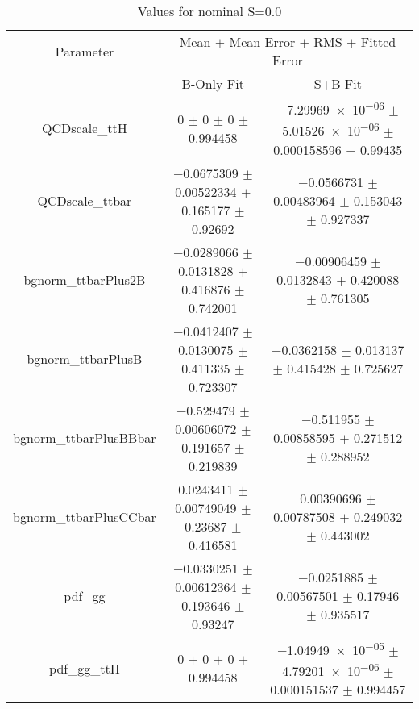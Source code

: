 \begin{table}
\centering
\caption{Values for nominal S=0.0}
\begin{tabular}{ccc}
\toprule
Parameter & \multicolumn{2}{c}{Mean $\pm$ Mean Error $\pm$ RMS $\pm$ Fitted Error}\\
 & B-Only Fit & S+B Fit\\
\midrule
QCDscale\_ttH & \num{0} $\pm$ \num{0} $\pm$ \num{0} $\pm$ \num{0.994458} & \num{-7.29969e-06} $\pm$ \num{5.01526e-06} $\pm$ \num{0.000158596} $\pm$ \num{0.99435}\\
QCDscale\_ttbar & \num{-0.0675309} $\pm$ \num{0.00522334} $\pm$ \num{0.165177} $\pm$ \num{0.92692} & \num{-0.0566731} $\pm$ \num{0.00483964} $\pm$ \num{0.153043} $\pm$ \num{0.927337}\\
bgnorm\_ttbarPlus2B & \num{-0.0289066} $\pm$ \num{0.0131828} $\pm$ \num{0.416876} $\pm$ \num{0.742001} & \num{-0.00906459} $\pm$ \num{0.0132843} $\pm$ \num{0.420088} $\pm$ \num{0.761305}\\
bgnorm\_ttbarPlusB & \num{-0.0412407} $\pm$ \num{0.0130075} $\pm$ \num{0.411335} $\pm$ \num{0.723307} & \num{-0.0362158} $\pm$ \num{0.013137} $\pm$ \num{0.415428} $\pm$ \num{0.725627}\\
bgnorm\_ttbarPlusBBbar & \num{-0.529479} $\pm$ \num{0.00606072} $\pm$ \num{0.191657} $\pm$ \num{0.219839} & \num{-0.511955} $\pm$ \num{0.00858595} $\pm$ \num{0.271512} $\pm$ \num{0.288952}\\
bgnorm\_ttbarPlusCCbar & \num{0.0243411} $\pm$ \num{0.00749049} $\pm$ \num{0.23687} $\pm$ \num{0.416581} & \num{0.00390696} $\pm$ \num{0.00787508} $\pm$ \num{0.249032} $\pm$ \num{0.443002}\\
pdf\_gg & \num{-0.0330251} $\pm$ \num{0.00612364} $\pm$ \num{0.193646} $\pm$ \num{0.93247} & \num{-0.0251885} $\pm$ \num{0.00567501} $\pm$ \num{0.17946} $\pm$ \num{0.935517}\\
pdf\_gg\_ttH & \num{0} $\pm$ \num{0} $\pm$ \num{0} $\pm$ \num{0.994458} & \num{-1.04949e-05} $\pm$ \num{4.79201e-06} $\pm$ \num{0.000151537} $\pm$ \num{0.994457}\\
\bottomrule
\end{tabular}
\end{table}